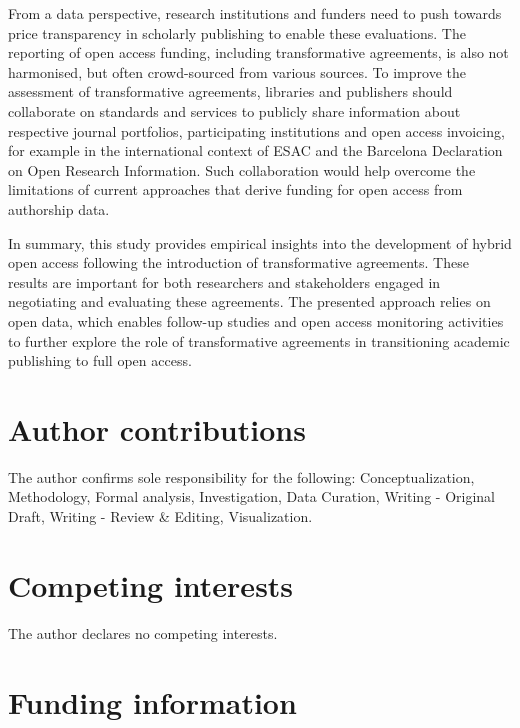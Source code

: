 \documentclass[a4paper,man,floatsintext,longtable,noextraspace,12pt]{apa6}
\begin{document}
From a data perspective, research institutions and funders need to push
towards price transparency in scholarly publishing to enable these
evaluations. The reporting of open access funding, including
transformative agreements, is also not harmonised, but often
crowd-sourced from various sources. To improve the assessment of
transformative agreements, libraries and publishers should collaborate
on standards and services to publicly share information about respective
journal portfolios, participating institutions and open access
invoicing, for example in the international context of ESAC and the
Barcelona Declaration on Open Research Information. Such collaboration
would help overcome the limitations of current approaches that derive
funding for open access from authorship data.

In summary, this study provides empirical insights into the development
of hybrid open access following the introduction of transformative
agreements. These results are important for both researchers and
stakeholders engaged in negotiating and evaluating these agreements. The
presented approach relies on open data, which enables follow-up studies
and open access monitoring activities to further explore the role of
transformative agreements in transitioning academic publishing to full
open access.

\section*{Author contributions}\label{author-contributions}

The author confirms sole responsibility for the following:
Conceptualization, Methodology, Formal analysis, Investigation, Data
Curation, Writing - Original Draft, Writing - Review \& Editing,
Visualization.

\section*{Competing interests}\label{competing-interests}

The author declares no competing interests.

\section*{Funding information}\label{funding-information}
\end{document}
